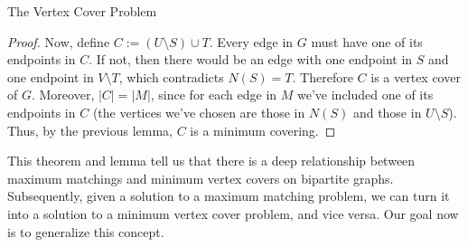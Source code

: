 \begin{section}{The Vertex Cover Problem}
\begin{proof}
		Now, define $C := (U\setminus S)\cup T$. Every edge 
		in $G$ must have one of its endpoints in $C$. If not, then there would be an 
		edge with one endpoint in $S$ and one endpoint in $V\setminus T$, which contradicts 
		$N(S) = T$. Therefore $C$ is a vertex cover of $G$. Moreover, $|C| = |M|$, since for each 
		edge in $M$ we've included one of its endpoints in $C$ (the vertices we've chosen are 
		those in $N(S)$ and those in $U\setminus S$). Thus, by the previous lemma, $C$ is 
		a minimum covering.
	\end{proof}

	This theorem and lemma tell us that there is a deep relationship between maximum matchings and 
	minimum vertex covers on bipartite graphs. Subsequently, given a solution to a maximum matching 
	problem, we can turn it into a solution to a minimum vertex cover problem, and vice versa. Our 
	goal now is to generalize this concept.
\end{section}

